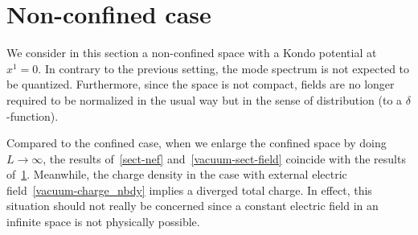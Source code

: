\section{Non-confined case}\label{vacuum-without_bdy}
We consider in this section a non-confined space with a Kondo potential at $x^1 = 0$.
In contrary to the previous setting, the mode spectrum is not expected to be quantized.
Furthermore, since the space is not compact, fields are no longer required to be normalized in the usual way but in the sense of distribution (to a $\delta$-function).  


Compared to the confined case, when we enlarge the confined space by doing $L \rightarrow \infty$, 
the results of~\cref{sect-nef} and~\cref{vacuum-sect-field} coincide with the results of~\cref{vacuum-without_bdy}.
Meanwhile, the charge density in the case with external electric field~\cref{vacuum-charge_nbdy} implies a diverged total charge.
In effect, this situation should not really be concerned since a constant electric field in an infinite space is not physically possible.
